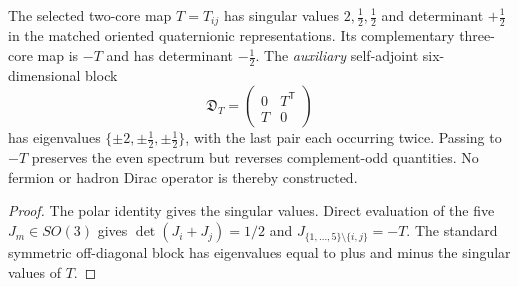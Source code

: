 \documentclass[12pt,a4paper]{article}
\begin{document}
\begin{proposition}
\label{p3c:prop:v319-petersen-complement-spectrum}
The selected two-core map $T=T_{ij}$ has singular values
$2,\tfrac12,\tfrac12$ and determinant $+\tfrac12$ in the
matched oriented quaternionic representations.  Its complementary
three-core map is $-T$ and has determinant $-\tfrac12$.
The \emph{auxiliary} self-adjoint six-dimensional block
\[
 \mathfrak D_T=\begin{pmatrix}0&T^{\mathsf T}\\T&0\end{pmatrix}
\]
has eigenvalues $\{\pm2,\pm\tfrac12,\pm\tfrac12\}$, with the
last pair each occurring twice.  Passing to $-T$ preserves the even
spectrum but reverses complement-odd quantities.  No fermion or
hadron Dirac operator is thereby constructed.
\end{proposition}
\begin{proof}
The polar identity gives the singular values.  Direct evaluation of
the five $J_m\in SO(3)$ gives $\det(J_i+J_j)=1/2$ and
$J_{\{1,\ldots,5\}\setminus\{i,j\}}=-T$.  The standard
symmetric off-diagonal block has eigenvalues equal to plus and minus
the singular values of $T$.
\end{proof}
\end{document}
